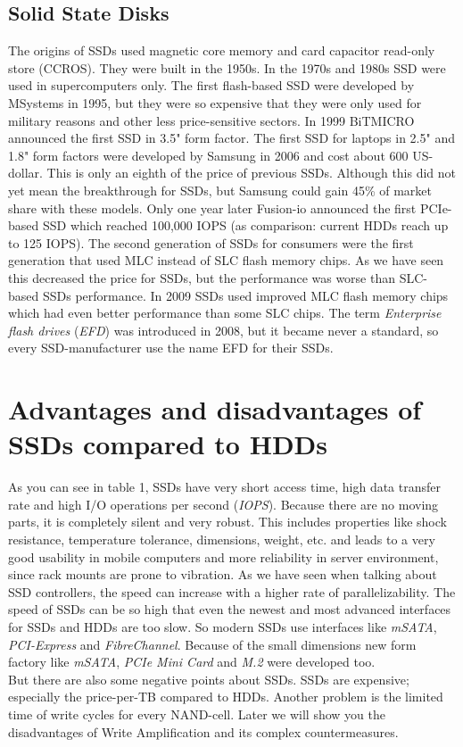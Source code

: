 \documentclass{acm_proc_article-sp}
\begin{document}
\subsection{Solid State Disks}
The origins of SSDs used magnetic core memory and card capacitor read-only store (CCROS). They were built in the 1950s. In the 1970s and 1980s SSD were used in supercomputers only. The first flash-based SSD were developed by MSystems in 1995, but they were so expensive that they were only used for military reasons and other less price-sensitive sectors. In 1999 BiTMICRO announced the first SSD in 3.5" form factor. The first SSD for laptops in 2.5" and 1.8" form factors were developed by Samsung in 2006 and cost about 600 US-dollar. This is only an eighth of the price of previous SSDs. Although this did not yet mean the breakthrough for SSDs, but Samsung could gain 45\% of market share with these models. Only one year later Fusion-io announced the first PCIe-based SSD which reached 100,000 IOPS (as comparison: current HDDs reach up to 125 IOPS). The second generation of SSDs for consumers were the first generation that used MLC instead of SLC flash memory chips. As we have seen this decreased the price for SSDs, but the performance was worse than SLC-based SSDs performance. In 2009 SSDs used improved MLC flash memory chips which had even better performance than some SLC chips. The term \emph{Enterprise flash drives} (\emph{EFD}) was introduced in 2008, but it became never a standard, so every SSD-manufacturer use the name EFD for their SSDs.

\section{Advantages and disadvantages of SSDs compared to HDDs}

As you can see in table 1, SSDs have very short access time, high data transfer rate and high I/O operations per second (\emph{IOPS}). Because there are no moving parts, it is completely silent and very robust. This includes properties like shock resistance, temperature tolerance, dimensions, weight, etc. and leads to a very good usability in mobile computers and more reliability in server environment, since rack mounts are prone to vibration. As we have seen when talking about SSD controllers, the speed can increase with a higher rate of parallelizability. The speed of SSDs can be so high that even the newest and most advanced interfaces for SSDs and HDDs are too slow. So modern SSDs use interfaces like \emph{mSATA}, \emph{PCI-Express} and \emph{FibreChannel}. Because of the small dimensions new form factory like \emph{mSATA}, \emph{PCIe Mini Card} and \emph{M.2} were developed too.
\\
But there are also some negative points about SSDs. SSDs are expensive; especially the price-per-TB compared to HDDs. Another problem is the limited time of write cycles for every NAND-cell. Later we will show you the disadvantages of Write Amplification and its complex countermeasures.
\end{document}
